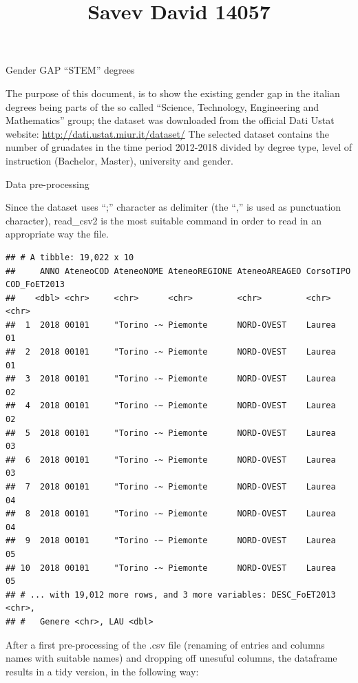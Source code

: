 \documentclass[
]{article}
\title{Savev David 14057}
\author{}
\date{\vspace{-2.5em}}
\begin{document}
\maketitle

Gender GAP ``STEM'' degrees

The purpose of this document, is to show the existing gender gap in the
italian degrees being parts of the so called ``Science, Technology,
Engineering and Mathematics'' group; the dataset was downloaded from the
official Dati Ustat website: \url{http://dati.ustat.miur.it/dataset/}
The selected dataset contains the number of gruadates in the time period
2012-2018 divided by degree type, level of instruction (Bachelor,
Master), university and gender.

Data pre-processing

Since the dataset uses ``;'' character as delimiter (the ``,'' is used
as punctuation character), read\_csv2 is the most suitable command in
order to read in an appropriate way the file.

\begin{verbatim}
## # A tibble: 19,022 x 10
##     ANNO AteneoCOD AteneoNOME AteneoREGIONE AteneoAREAGEO CorsoTIPO COD_FoET2013
##    <dbl> <chr>     <chr>      <chr>         <chr>         <chr>     <chr>       
##  1  2018 00101     "Torino -~ Piemonte      NORD-OVEST    Laurea    01          
##  2  2018 00101     "Torino -~ Piemonte      NORD-OVEST    Laurea    01          
##  3  2018 00101     "Torino -~ Piemonte      NORD-OVEST    Laurea    02          
##  4  2018 00101     "Torino -~ Piemonte      NORD-OVEST    Laurea    02          
##  5  2018 00101     "Torino -~ Piemonte      NORD-OVEST    Laurea    03          
##  6  2018 00101     "Torino -~ Piemonte      NORD-OVEST    Laurea    03          
##  7  2018 00101     "Torino -~ Piemonte      NORD-OVEST    Laurea    04          
##  8  2018 00101     "Torino -~ Piemonte      NORD-OVEST    Laurea    04          
##  9  2018 00101     "Torino -~ Piemonte      NORD-OVEST    Laurea    05          
## 10  2018 00101     "Torino -~ Piemonte      NORD-OVEST    Laurea    05          
## # ... with 19,012 more rows, and 3 more variables: DESC_FoET2013 <chr>,
## #   Genere <chr>, LAU <dbl>
\end{verbatim}

After a first pre-processing of the .csv file (renaming of entries and
columns names with suitable names) and dropping off unesuful columns,
the dataframe results in a tidy version, in the following way:
\end{document}
